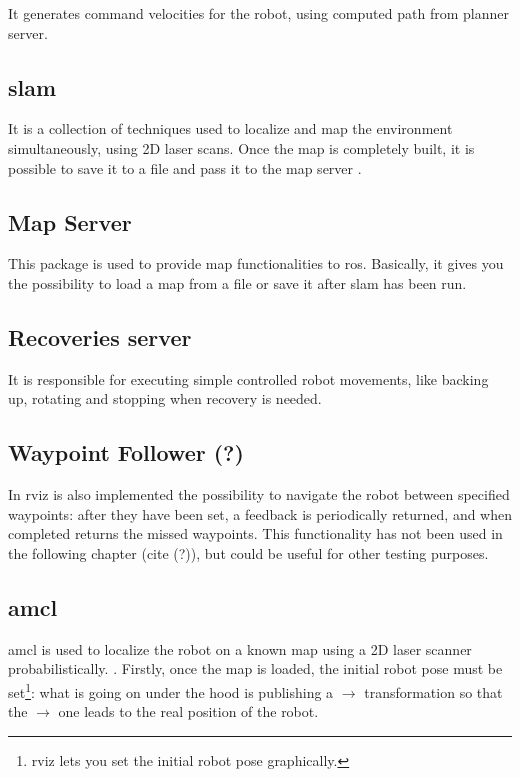 It generates command velocities for the robot, using computed path from planner server.

\subsection{\acrfull{slam}}

It is a collection of techniques used to localize and map the environment simultaneously, using 2D laser scans. Once the map is completely built, it is possible to save it to a file and pass it to the map server \cite{slam}.

\subsection{Map Server}

This package is used to provide map functionalities to \acrshort{ros}. Basically, it gives you the possibility to load a map from a file or save it after \acrshort{slam} has been run.

\subsection{Recoveries server}

It is responsible for executing simple controlled robot movements, like backing up, rotating and stopping when recovery is needed.

\subsection{Waypoint Follower (?)} 

In \acrshort{rviz} is also implemented the possibility to navigate the robot between specified waypoints: after they have been set, a feedback is periodically returned, and when completed returns the missed waypoints. This functionality has not been used in the following chapter (cite (?)), but could be useful for other testing purposes.

\subsection{\acrfull{amcl}}

\acrshort{amcl} is used to localize the robot on a known map using a 2D laser scanner probabilistically.
. Firstly, once the map is loaded, the initial robot pose must be set\footnote{\acrshort{rviz} lets you set the initial robot pose graphically.}: what is going on under the hood is publishing a  $\rightarrow$  transformation so that the  $\rightarrow$  one leads to the real position of the robot.

